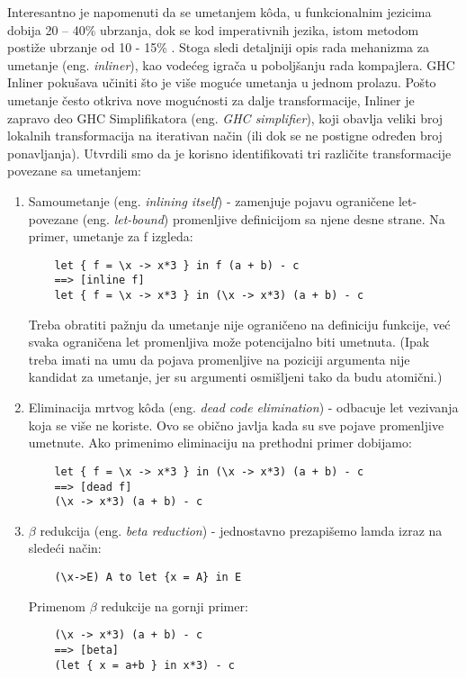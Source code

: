 Interesantno je napomenuti da se umetanjem k\^{o}da, u funkcionalnim jezicima dobija 20 – 40\% ubrzanja, dok se kod imperativnih jezika, istom metodom postiže ubrzanje od 10 - 15\% \cite{Cinliner}. Stoga sledi detaljniji opis rada mehanizma za umetanje (eng. \emph{inliner}), kao vodećeg igrača u poboljšanju rada kompajlera. GHC Inliner pokušava učiniti što je više moguće umetanja u jednom prolazu. Pošto umetanje često otkriva nove mogućnosti za dalje transformacije, Inliner je zapravo deo GHC Simplifikatora (eng. \emph{GHC simplifier}), koji obavlja veliki broj lokalnih transformacija na iterativan način (ili dok se ne postigne određen broj ponavljanja).
Utvrdili smo da je korisno identifikovati tri različite transformacije povezane sa umetanjem:
\begin{enumerate}
	\item  Samoumetanje (eng. \emph{inlining itself}) - zamenjuje pojavu ograničene let-povezane (eng. \emph{let-bound}) promenljive definicijom sa njene desne strane. Na primer, umetanje za f izgleda: 
	\begin{verbatim}
	let { f = \x -> x*3 } in f (a + b) - c
	==> [inline f]
	let { f = \x -> x*3 } in (\x -> x*3) (a + b) - c
	\end{verbatim}
	Treba obratiti pažnju da umetanje nije ograničeno na definiciju funkcije, već svaka ograničena let promenljiva može potencijalno biti umetnuta. (Ipak treba imati na umu da pojava promenljive na poziciji argumenta nije kandidat za umetanje, jer su argumenti osmišljeni tako da budu atomični.)
	\item Eliminacija mrtvog k\^{o}da (eng. \emph{dead code elimination}) - odbacuje let vezivanja koja se više ne koriste. Ovo se obično javlja 	kada su sve pojave promenljive umetnute. Ako primenimo eliminaciju na prethodni primer dobijamo:
	\begin{verbatim}
	let { f = \x -> x*3 } in (\x -> x*3) (a + b) - c
	==> [dead f]
	(\x -> x*3) (a + b) - c
	\end{verbatim}
	\item $\beta$  redukcija (eng. \emph{beta reduction}) - jednostavno prezapišemo lamda izraz na sledeći način:
	\begin{verbatim}
	(\x->E) A to let {x = A} in E 
	\end{verbatim} Primenom $\beta$ redukcije na gornji primer:
	\begin{verbatim}
	(\x -> x*3) (a + b) - c
	==> [beta]
	(let { x = a+b } in x*3) - c
	\end{verbatim}
\end{enumerate}

